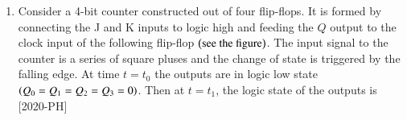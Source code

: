 \documentclass[journal]{IEEEtran}
\begin{document}
\begin{enumerate}[start=40]
\item Consider a 4-bit counter constructed out of four flip-flops. It is formed by connecting the J and K inputs to logic high and feeding the $Q$ output to the clock input of the following flip-flop $\left(\text{see the figure}\right)$. The input signal to the counter is a series of square pluses and the change of state is triggered by the falling edge. At time $t=t_0$ the outputs are in logic low state $\left(Q_0=Q_1=Q_2=Q_3=0\right)$. Then at $t=t_1$, the logic state of the outputs is \hfill{[2020-PH]}\\
\begin{figure}[H]
			\centering
			
			\label{40}
		\end{figure}
\begin{figure}[H]
			\centering
			
		\end{figure}


\end{enumerate}
\end{document}
